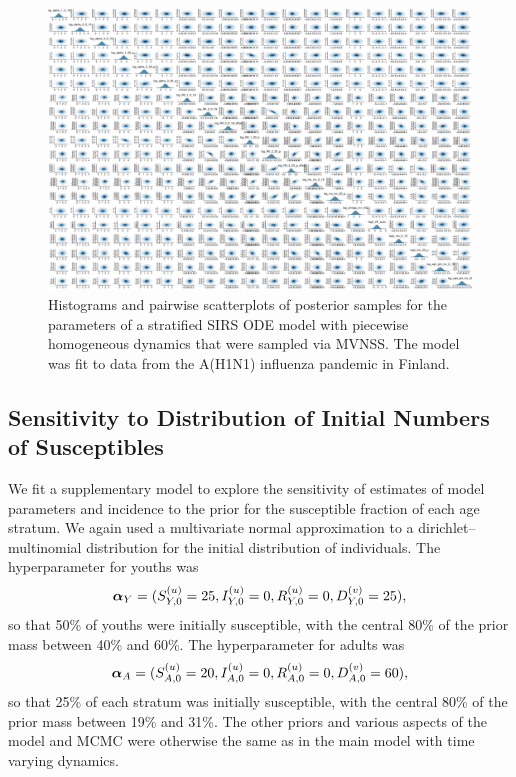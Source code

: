 \begin{figure}
	\centering
	\includegraphics[width=\linewidth]{figures/flu_const_pairs}
	\caption{Histograms and pairwise scatterplots of posterior samples for the parameters of a stratified SIRS ODE model with piecewise homogeneous dynamics that were sampled via MVNSS. The model was fit to data from the A(H1N1) influenza pandemic in Finland.}
	\label{fig:fluconstpairs}
\end{figure}

\newpage
\subsection{Sensitivity to Distribution of Initial Numbers of Susceptibles}
\label{subsec:flu_highsusc_sensitivity}

We fit a supplementary model to explore the sensitivity of estimates of model parameters and incidence to the prior for the susceptible fraction of each age stratum. We again used a multivariate normal approximation to a dirichlet--multinomial distribution for the initial distribution of individuals. The hyperparameter for youths was $$ \boldsymbol{\alpha}_Y = ({S_{Y,0}^{(u)}} = 25, {I_{Y,0}^{(u)}}=0,{R_{Y,0}^{(u)}}=0,D_{Y,0}^{(v)} = 25), $$ so that 50\% of youths were initially susceptible, with the central 80\% of the prior mass between 40\% and 60\%. The hyperparameter for adults was $$ \boldsymbol{\alpha}_A = ({S_{A,0}^{(u)}} = 20, {I_{A,0}^{(u)}}=0,{R_{A,0}^{(u)}}=0,D_{A,0}^{(v)} = 60), $$ so that 25\% of each stratum was initially susceptible, with the central 80\% of the prior mass between 19\% and 31\%. The other priors and various aspects of the model and MCMC were otherwise the same as in the main model with time varying dynamics.

